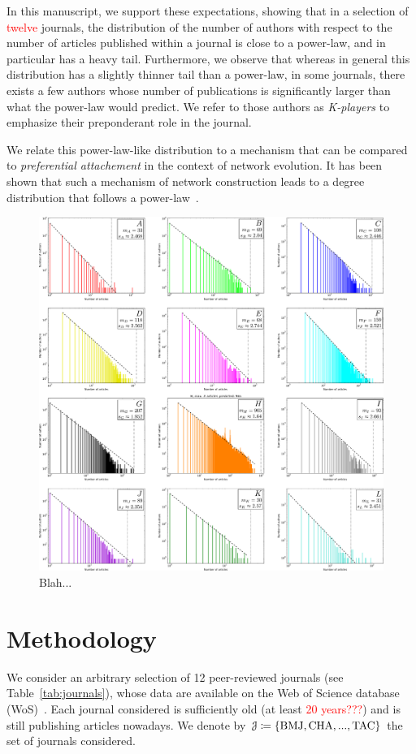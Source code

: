 \documentclass[aps,prl,floatfix,twocolumn]{revtex4-1}
\begin{document}
In this manuscript, we support these expectations, showing that in a selection of \textcolor{red}{twelve} journals, the distribution of the number of authors with respect to the number of articles published within a journal is close to a power-law, and in particular has a heavy tail. 
Furthermore, we observe that whereas in general this distribution has a slightly thinner tail than a power-law, in some journals, there exists a few authors whose number of publications is significantly larger than what the power-law would predict. 
We refer to those authors as \emph{K-players} to emphasize their preponderant role in the journal. 

We relate this power-law-like distribution to a mechanism that can be compared to \emph{preferential attachement} in the context of network evolution. 
It has been shown that such a mechanism of network construction leads to a degree distribution that follows a power-law~\cite{Kra00}.

\begin{figure}
 \centering
 \includegraphics[width=\textwidth]{../figures/ABCDEFGHIJKL.pdf}
 \caption{Blah...}
 \label{fig:1}
\end{figure}

\section{Methodology}
We consider an arbitrary selection of 12 peer-reviewed journals (see Table~\ref{tab:journals}), whose data are available on the Web of Science database (WoS)~\cite{WoS}. 
Each journal considered is sufficiently old (at least \textcolor{red}{20 years???}) and is still publishing articles nowadays. 
We denote by ${\cal J}\coloneqq\{{\rm BMJ},{\rm CHA},...,{\rm TAC}\}$ the set of journals considered.
\end{document}
